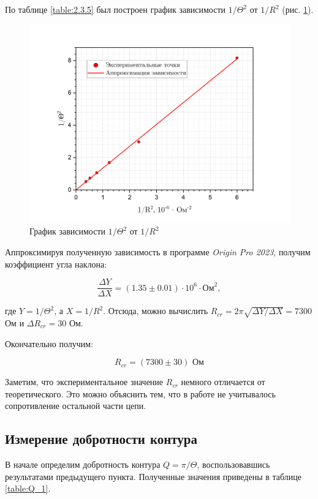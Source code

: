 \documentclass[a4paper, 12pt]{article}
\begin{document}
    По таблице \ref{table:2.3.5} был построен график зависимости $1/\Theta^2$ от $1/R^2$ (рис. \ref{graph:theta}).

    \begin{figure}[H]
        \centering
        \includegraphics[scale = 0.6]{images/graph_theta.png}
        \caption{График зависимости $1/\Theta^2$ от $1/R^2$}
        \label{graph:theta}
    \end{figure}

     Аппроксимируя полученную зависимость в программе \textit{Origin Pro 2023}, получим коэффициент угла наклона:

     $$
     \frac{\Delta Y}{\Delta X} = \left( 1.35 \pm 0.01 \right) \cdot 10^6 \cdot \text{Ом}^2,
     $$

     где $Y = 1/\Theta^2$, а $X = 1/R^2$. Отсюда, можно вычислить $R_{cr} = 2 \pi \sqrt{\Delta Y / \Delta X} = 7300$ Ом и $\Delta R_{cr} = 30$ Ом.

     Окончательно получим:

     $$
     \boxed{R_{cr} = \left( 7300 \pm 30 \right) \text{ Ом}}
     $$

     Заметим, что экспериментальное значение $R_{cr}$ немного отличается от теоретического. Это можно объяснить тем, что в работе не учитывалось сопротивление остальной части цепи.

     \subsection{Измерение добротности контура}

    В начале определим добротность контура $Q = \pi / \Theta$, воспользовавшись результатами предыдущего пункта. Полученные значения приведены в таблице \ref{table:Q_1}.
\end{document}
